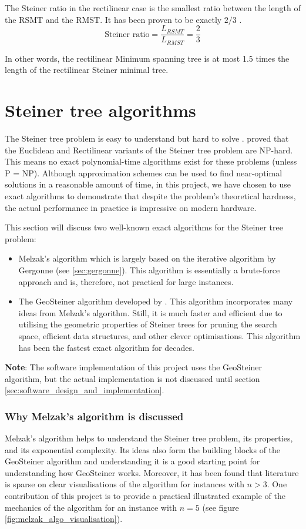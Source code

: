 \documentclass{l4proj}
\begin{document}
The Steiner ratio in the rectilinear case is the smallest ratio between the length of the RSMT and the RMST. It has been proven to be exactly $2/3$ \cite{Brazil2015}.
$$
    \text{Steiner ratio} = \frac{L_{RSMT}}{L_{RMST}} = \frac{2}{3}
$$

In other words, the rectilinear Minimum spanning tree is at most 1.5 times the length of the rectilinear Steiner minimal tree.

\section{Steiner tree algorithms}
\label{sec:algorithms}
The Steiner tree problem is easy to understand but hard to solve \citep{Brazil2015}. \cite{Garey1977} proved that the Euclidean and Rectilinear variants of the Steiner tree problem are NP-hard. This means no exact polynomial-time algorithms exist for these problems (unless P = NP).
Although approximation schemes can be used to find near-optimal solutions in a reasonable amount of time, in this project, we have chosen to use exact algorithms to demonstrate that despite the problem's theoretical hardness, the actual performance in practice is impressive on modern hardware.

This section will discuss two well-known exact algorithms for the Steiner tree problem:
\begin{itemize}
    \item Melzak's algorithm \cite{MelzakAlgo} which is largely based on the iterative algorithm by Gergonne \citep{Brazil2014} (see \ref{sec:gergonne}). This algorithm is essentially a brute-force approach and is, therefore, not practical for large instances.
    \item The GeoSteiner algorithm developed by \cite{geosteiner96}. This algorithm incorporates many ideas from Melzak's algorithm. Still, it is much faster and efficient due to utilising the geometric properties of Steiner trees for pruning the search space, efficient data structures, and other clever optimisations. This algorithm has been the fastest exact algorithm for decades.
\end{itemize}
\textbf{Note}: The software implementation of this project uses the GeoSteiner algorithm, but the actual implementation is not discussed until section \ref{sec:software_design_and_implementation}.

\subsubsection{Why Melzak's algorithm is discussed}
Melzak's algorithm helps to understand the Steiner tree problem, its properties, and its exponential complexity. Its ideas also form the building blocks of the GeoSteiner algorithm and understanding it is a good starting point for understanding how GeoSteiner works. Moreover, it has been found that literature is sparse on clear visualisations of the algorithm for instances with $n>3$. One contribution of this project is to provide a practical illustrated example of the mechanics of the algorithm for an instance with $n=5$ (see figure \ref{fig:melzak_algo_visualisation}).
\end{document}
